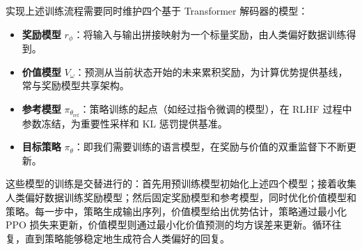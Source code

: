 实现上述训练流程需要同时维护四个基于 Transformer 解码器的模型：
\begin{itemize}
\item \textbf{奖励模型} $r_{\phi}$：将输入与输出拼接映射为一个标量奖励，由人类偏好数据训练得到。
\item \textbf{价值模型} $V_{\omega}$：预测从当前状态开始的未来累积奖励，为计算优势提供基线，常与奖励模型共享架构。
\item \textbf{参考模型} $\pi_{\theta_{\mathrm{ref}}}$：策略训练的起点（如经过指令微调的模型），在 RLHF 过程中参数冻结，为重要性采样和 KL 惩罚提供基准。
\item \textbf{目标策略} $\pi_{\theta}$：即我们需要训练的语言模型，在奖励与价值的双重监督下不断更新。
\end{itemize}

这些模型的训练是交替进行的：首先用预训练模型初始化上述四个模型；接着收集人类偏好数据训练奖励模型；然后固定奖励模型和参考模型，同时优化价值模型和策略。每一步中，策略生成输出序列，价值模型给出优势估计，策略通过最小化 PPO 损失来更新，价值模型则通过最小化价值预测的均方误差来更新。循环往复，直到策略能够稳定地生成符合人类偏好的回复。